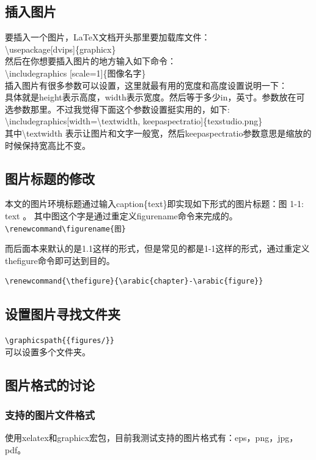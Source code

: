 \documentclass[11pt,oneside]{book}
\begin{document}
\begin{common-format}
\section{插入图片}
要插入一个图片，\LaTeX 文档开头那里要加载库文件：\\
\textbackslash usepackage[dvips]\{graphicx\}\\
然后在你想要插入图片的地方输入如下命令：\\
\textbackslash includegraphics [scale=1]\{图像名字\}\\
插入图片有很多参数可以设置，这里就最有用的宽度和高度设置说明一下：\\
具体就是height表示高度，width表示宽度。然后等于多少in，英寸。参数放在可选参数那里。不过我觉得下面这个参数设置挺实用的，如下:\\
\textbackslash includegraphics[width=\textbackslash textwidth, keepaspectratio]\{texstudio.png\}\\
其中\textbackslash textwidth 表示让图片和文字一般宽，然后keepaspectratio参数意思是缩放的时候保持宽高比不变。

\subsection{图片标题的修改}
\label{sec:图片标题的修改}
本文的图片环境标题通过输入caption\{text\}即实现如下形式的图片标题：图 1-1: text  。
其中图这个字是通过重定义figurename命令来完成的。\\
\verb+\renewcommand\figurename{图}+

而后面本来默认的是1.1这样的形式，但是常见的都是1-1这样的形式，通过重定义thefigure命令即可达到目的。
\begin{Verbatim}
\renewcommand{\thefigure}{\arabic{chapter}-\arabic{figure}}
\end{Verbatim}

\subsection{设置图片寻找文件夹}
\verb+\graphicspath{{figures/}}+\\
可以设置多个文件夹。

\subsection{图片格式的讨论}
\subsubsection{支持的图片文件格式}
使用xelatex和graphicx宏包，目前我测试支持的图片格式有：eps，png，jpg，pdf。


\end{common-format}
\end{document}
